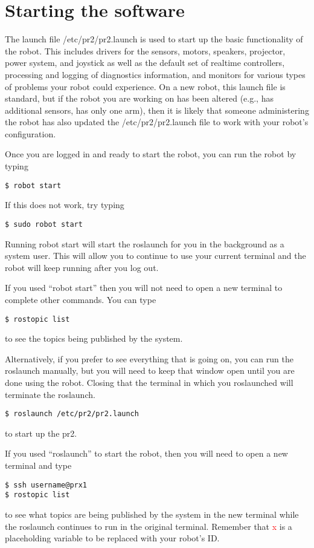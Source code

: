 \section{Starting the software}
The launch file /etc/pr2/pr2.launch is used to start up the basic functionality of the robot.  This includes drivers for 
the sensors, motors, speakers, projector, power system, and joystick as well as the default set of realtime controllers, 
processing and logging of diagnostics information, and monitors for various types of problems your robot could experience.  On a new robot, this launch file is standard, but if the robot you are working on has been altered (e.g., has additional sensors, has only one arm), then it is likely that someone administering the robot has also updated the /etc/pr2/pr2.launch file to work with your robot's configuration.

Once you are logged in and ready to start the robot, you can run the robot by typing
\begin{verbatim}
$ robot start
\end{verbatim}
If this does not work, try typing
\begin{verbatim}
$ sudo robot start
\end{verbatim}
Running robot start will start the roslaunch for you in the background as a system user. This will 
allow you to continue to use your current terminal and the robot will keep running after you log out.  

If you used ``robot start'' then you will not need to open a new terminal to complete other commands. You can type 
\begin{verbatim}
$ rostopic list
\end{verbatim}
to see the topics being published by the system. 

Alternatively, if you prefer to see everything that is going on, you can run the roslaunch manually, but you will need to keep that 
window open until you are done using the robot. Closing that the terminal in which you roslaunched will terminate the 
roslaunch.
\begin{verbatim}
$ roslaunch /etc/pr2/pr2.launch
\end{verbatim}
to start up the pr2.  

If you used ``roslaunch'' to start the robot, then you will need to open a new terminal and type
\begin{verbatim}
$ ssh username@prx1
$ rostopic list
\end{verbatim}
to see what topics are being published by the system in the new terminal while the roslaunch continues to run in the 
original terminal. Remember that \textcolor{red}{x} is a placeholding variable to be replaced with your robot's ID.

